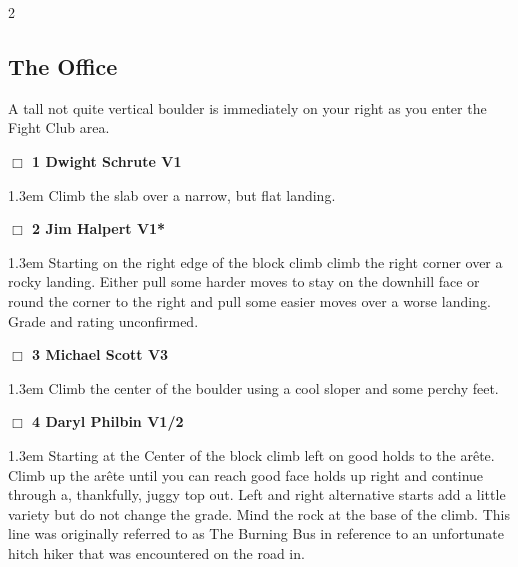\begin{multicols}{2}
\subsection*{The Office}\label{bf:The Office}
A tall not quite vertical boulder is immediately on your right as you enter the Fight Club area.\\
\needspace{2em}
\label{rt:Dwight Schrute}
\colorbox{green!20}{
\parbox{0.95\linewidth}{
\hspace{-1ex}\textbf{$\Box$
1 Dwight Schrute V1  \warn
}}}
\begin{adjustwidth}{1.3em}{}			
Climb the slab over a narrow, but flat landing.
\end{adjustwidth}
\needspace{2em}
\label{rt:Jim Halpert}
\colorbox{green!20}{
\parbox{0.95\linewidth}{
\hspace{-1ex}\textbf{$\Box$
2 Jim Halpert V1*  \warn\warn
}}}
\begin{adjustwidth}{1.3em}{}			
Starting on the right edge of the block climb climb the right corner over a rocky landing. Either pull some harder moves to stay on the downhill face or round the corner to the right and pull some easier moves over a worse landing. Grade and rating unconfirmed.
\end{adjustwidth}
\needspace{2em}
\label{rt:Michael Scott}
\colorbox{green!20}{
\parbox{0.95\linewidth}{
\hspace{-1ex}\textbf{$\Box$
3 Michael Scott V3  \warn
}}}
\begin{adjustwidth}{1.3em}{}			
Climb the center of the boulder using a cool sloper and some perchy feet.
\end{adjustwidth}
\needspace{2em}
\label{rt:Daryl Philbin}
\colorbox{green!20}{
\parbox{0.95\linewidth}{
\hspace{-1ex}\textbf{$\Box$
4 Daryl Philbin V1/2  \warn
}}}
\begin{adjustwidth}{1.3em}{}			
Starting at the Center of the block climb left on good holds to the arête. Climb up the arête until you can reach good face holds up right and continue through a, thankfully, juggy top out. Left and right alternative starts add a little variety but do not change the grade. Mind the rock at the base of the climb. This line was originally referred to as The Burning Bus in reference to an unfortunate hitch hiker that was encountered on the road in.
\end{adjustwidth}
\needspace{2em}

\end{multicols}
